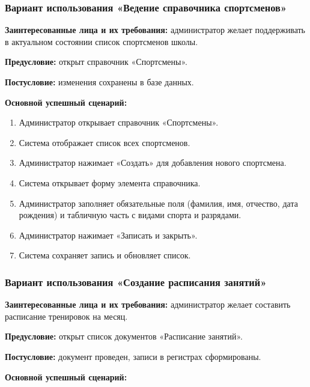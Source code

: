 \subsubsection{Вариант использования «Ведение справочника спортсменов»}

\textbf{Заинтересованные лица и их требования:} администратор желает поддерживать в актуальном состоянии список спортсменов школы.

\textbf{Предусловие:} открыт справочник «Спортсмены».

\textbf{Постусловие:} изменения сохранены в базе данных.

\textbf{Основной успешный сценарий:}

\begin{enumerate}
	\item Администратор открывает справочник «Спортсмены».
	\item Система отображает список всех спортсменов.
	\item Администратор нажимает «Создать» для добавления нового спортсмена.
	\item Система открывает форму элемента справочника.
	\item Администратор заполняет обязательные поля (фамилия, имя, отчество, дата рождения) и табличную часть с видами спорта и разрядами.
	\item Администратор нажимает «Записать и закрыть».
	\item Система сохраняет запись и обновляет список.
\end{enumerate}

\subsubsection{Вариант использования «Создание расписания занятий»}

\textbf{Заинтересованные лица и их требования:} администратор желает составить расписание тренировок на месяц.

\textbf{Предусловие:} открыт список документов «Расписание занятий».

\textbf{Постусловие:} документ проведен, записи в регистрах сформированы.

\textbf{Основной успешный сценарий:}

